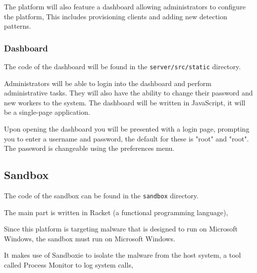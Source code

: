 The platform will also feature a dashboard allowing administrators to configure the platform,
This includes provisioning clients and adding new detection patterns.

\subsubsection{Dashboard}
The code of the dashboard will be found in the \texttt{server/src/static} directory.

Administrators will be able to login into the dashboard and perform administrative tasks.
They will also have the ability to change their password and new workers to the system.
The dashboard will be written in JavaScript, it will be a single-page application.

Upon opening the dashboard you will be presented with a login page, prompting you to enter a username and password, the default for these is "root" and "root".
The password is changeable using the preferences menu.



\subsection{Sandbox}
The code of the sandbox can be found in the \texttt{sandbox} directory.

The main part is written in Racket (a functional programming language),


Since this platform is targeting malware that is designed to run on Microsoft Windows,
the sandbox must run on Microsoft Windows.

It makes use of Sandboxie to isolate the malware from the host system,
a tool called Process Monitor to log system calls,






